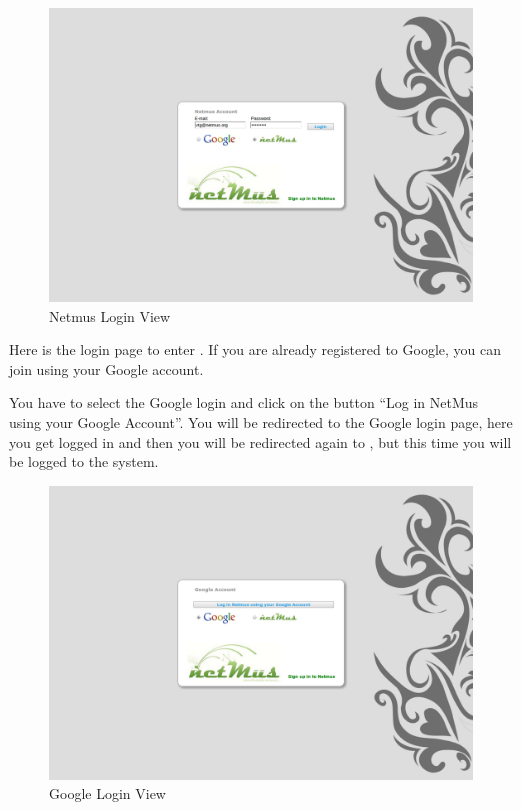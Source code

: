 \begin{figure}[htbp]
  \centering
  \includegraphics[width=15cm]{img/MU/login.png}
\caption{Netmus Login View}
\end{figure}


Here is the login page to enter . If you are already registered to
Google, you can join  using your Google account.

You have to select the Google login and click on the button ``Log in
NetMus using your Google Account''. You will be redirected to the Google login
page, here you get logged in and then you will be redirected again to
, but this time you will be logged to the system.\\

\begin{figure}[htbp]
  \centering
  \includegraphics[width=15cm]{img/MU/loginGoogle.png}
\caption{Google Login View}
\end{figure}


